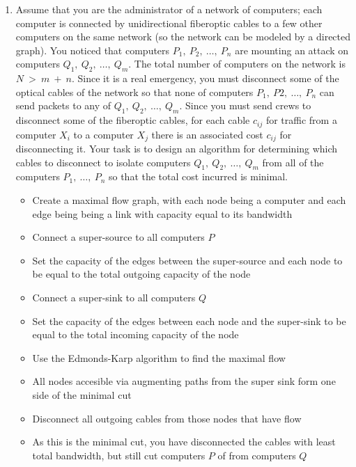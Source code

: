 \documentclass[a4paper]{article}
\begin{document}
\begin{enumerate}
		\item Assume that you are the administrator of a network of computers; each computer is connected by unidirectional fiberoptic cables to a few other computers on the same network (so the network can be modeled by a directed graph). You noticed that computers $P_1,\ P_2,\ \dots,\ P_n$ are mounting an attack on computers $Q_1,\ Q_2,\ \dots,\ Q_m$. The total number of computers on the network is $N\ >\ m\ +\ n$. Since it is a real emergency, you must disconnect some of the optical cables of the network so that none of computers $P_1,\ P2,\ \dots,\ P_n$ can send packets to any of $Q_1,\ Q_2,\ \dots,\ Q_m$. Since you must send crews to disconnect some of the fiberoptic cables, for each cable $c_{ij}$ for traffic from a computer $X_i$ to a computer $X_j$ there is an associated cost $c_{ij}$ for disconnecting it. Your task is to design an algorithm for determining which cables to disconnect to isolate computers $Q_1,\ Q_2,\ \dots,\ Q_m$ from all of the computers $P_1,\ \dots,\ P_n$ so that the total cost incurred is minimal.
				\begin{itemize}
						\item Create a maximal flow graph, with each node being a computer and each edge being being a link with capacity equal to its bandwidth 
						\item Connect a super-source to all computers $P$
						\item Set the capacity of the edges between the super-source and each node to be equal to the total outgoing capacity of the node
						\item Connect a super-sink to all computers $Q$
						\item Set the capacity of the edges between each node and the super-sink to be equal to the total incoming capacity of the node
						\item Use the Edmonds-Karp algorithm to find the maximal flow
						\item All nodes accesible via augmenting paths from the super sink form one side of the minimal cut
						\item Disconnect all outgoing cables from those nodes that have flow
						\item As this is the minimal cut, you have disconnected the cables with least total  bandwidth, but still cut computers $P$ of from computers $Q$
				\end{itemize}


\end{enumerate}
\end{document}
